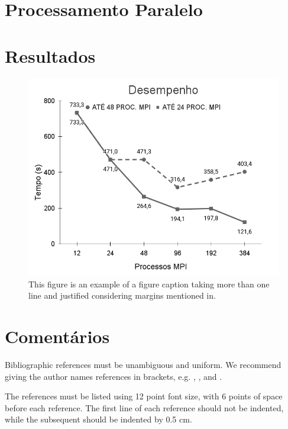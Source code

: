 \documentclass[12pt]{article}
\begin{document}
\section{Processamento Paralelo}

\section{Resultados}

\begin{figure}[ht]
\centering
\includegraphics[width=.7\textwidth]{figures/perfpernode.png}
\caption{This figure is an example of a figure caption taking more than one line and justified considering margins mentioned in.}
\label{fig:48pernode}
\end{figure}


\section{Comentários}



Bibliographic references must be unambiguous and uniform.  We recommend giving
the author names references in brackets, e.g. \cite{knuth:84},
\cite{boulic:91}, and \cite{smith:99}.

The references must be listed using 12 point font size, with 6 points of space
before each reference. The first line of each reference should not be
indented, while the subsequent should be indented by 0.5 cm.



\end{document}
